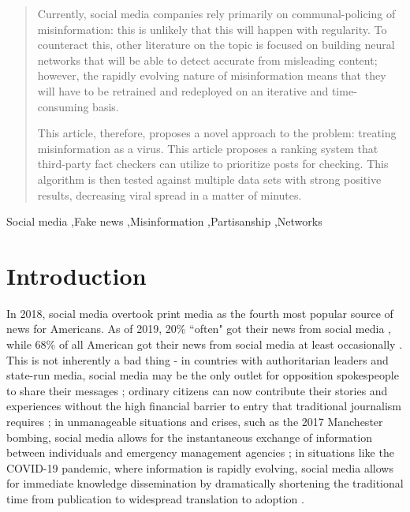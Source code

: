 \documentclass[preprint,12pt]{elsarticle}
\begin{document}
\begin{frontmatter}
\begin{abstract}
Currently, social media companies rely primarily on communal-policing of misinformation: this is unlikely that this will happen with regularity. To counteract this, other literature on the topic is focused on building neural networks that will be able to detect accurate from misleading content; however, the rapidly evolving nature of misinformation means that they will have to be retrained and redeployed on an iterative and time-consuming basis.

This article, therefore, proposes a novel approach to the problem: treating misinformation as a virus. This article proposes a ranking system that third-party fact checkers can utilize to prioritize posts for checking. This algorithm is then tested against multiple data sets with strong positive results, decreasing viral spread in a matter of minutes.
\end{abstract}


\begin{keyword}
Social media \sep Fake news \sep Misinformation \sep Partisanship \sep Networks
\end{keyword}

\end{frontmatter}


\section{Introduction}
\label{Introduction}


In 2018, social media overtook print media as the fourth most popular source of news for Americans. As of 2019, 20\% ``often" got their news from social media \cite{shearer2018social}, while 68\% of all American got their news from social media at least occasionally \cite{matsa2018news}. This is not inherently a bad thing - in countries with authoritarian leaders and state-run media, social media may be the only outlet for opposition spokespeople to share their messages \cite{walker2014breaking}; ordinary citizens can now contribute their stories and experiences without the high financial barrier to entry that traditional journalism requires \cite{qualman2012socialnomics, tapscott2008wikinomics}; in unmanageable situations and crises, such as the 2017 Manchester bombing, social media allows for the instantaneous exchange of information between individuals and emergency management agencies \cite{mirbabaie2020breaking, eriksson2016facebook}; in situations like the COVID-19 pandemic, where information is rapidly evolving, social media allows for immediate knowledge dissemination by dramatically shortening the traditional time from publication to widespread translation to adoption \cite{chan2020social}. 
 
\end{document}
